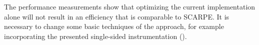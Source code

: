 The performance measurements show that optimizing the current implementation alone will not result in an efficiency that is comparable to SCARPE. It is necessary to change some basic techniques of the approach, for example incorporating the presented single-sided instrumentation ().
